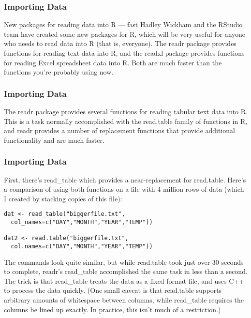 

\begin{frame}
\frametitle{Importing Data}
\large

New packages for reading data into R — fast
Hadley Wickham and the RStudio team have created some new packages for R, which will be very useful for anyone who needs to read data into R (that is, everyone). The readr package provides functions for reading text data into R, and the readxl package provides functions for reading Excel spreadsheet data into R. Both are much faster than the functions you're probably using now.
\end{frame}
\begin{frame}
\frametitle{Importing Data}
\large

The readr package provides several functions for reading tabular text data into R. This is a task normally accomplished with the read.table family of functions in R, and readr provides a number of replacement functions that provide additional functionality and are much faster.
\end{frame}
\begin{frame}
\frametitle{Importing Data}
\large

First, there's read_table which provides a near-replacement for read.table. Here's a comparison of using both functions on a file with 4 million rows of data (which I created by stacking copies of this file):
\begin{framed}
\begin{verbatim}
dat <- read_table("biggerfile.txt",
  col_names=c("DAY","MONTH","YEAR","TEMP"))

dat2 <- read.table("biggerfile.txt", 
  col.names=c("DAY","MONTH","YEAR","TEMP"))
\end{verbatim}
\end{framed}
The commands look quite similar, but while read.table took just over 30 seconds to complete, readr's read_table accomplished the same task in less than a second. The trick is that read_table treats the data as a fixed-format file, and uses C++ to process the data quickly. (One small caveat is that read.table supports arbitrary amounts of whitespace between columns, while read_table requires the columns be lined up exactly. In practice, this isn't much of a restriction.)
\end{frame}
